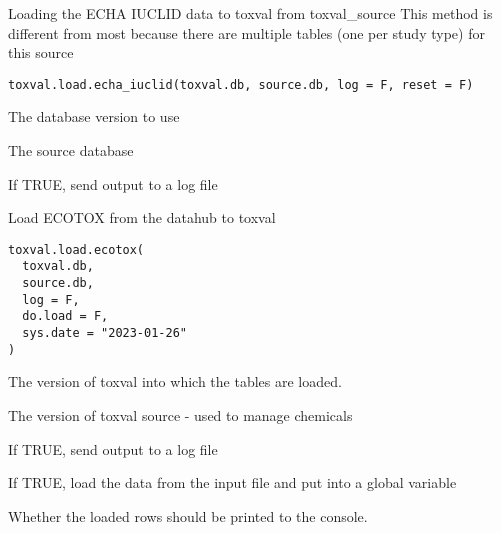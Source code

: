 \documentclass[letterpaper]{book}
\begin{document}
%
\begin{Description}\relax
Loading the ECHA IUCLID data to toxval from toxval\_source
This method is different from most because there are multiple tables (one per study
type) for this source
\end{Description}
%
\begin{Usage}
\begin{verbatim}
toxval.load.echa_iuclid(toxval.db, source.db, log = F, reset = F)
\end{verbatim}
\end{Usage}
%
\begin{Arguments}
\begin{ldescription}
\item[\code{toxval.db}] The database version to use

\item[\code{source.db}] The source database

\item[\code{log}] If TRUE, send output to a log file
\end{ldescription}
\end{Arguments}
%
\begin{Description}\relax
Load ECOTOX from the datahub to toxval
\end{Description}
%
\begin{Usage}
\begin{verbatim}
toxval.load.ecotox(
  toxval.db,
  source.db,
  log = F,
  do.load = F,
  sys.date = "2023-01-26"
)
\end{verbatim}
\end{Usage}
%
\begin{Arguments}
\begin{ldescription}
\item[\code{toxval.db}] The version of toxval into which the tables are loaded.

\item[\code{source.db}] The version of toxval source - used to manage chemicals

\item[\code{log}] If TRUE, send output to a log file

\item[\code{do.load}] If TRUE, load the data from the input file and put into a global variable

\item[\code{verbose}] Whether the loaded rows should be printed to the console.
\end{ldescription}
\end{Arguments}
\end{document}
